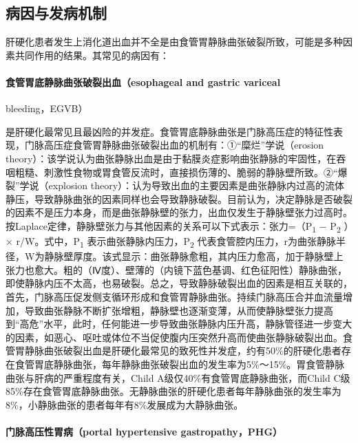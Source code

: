 \subsection{病因与发病机制}

肝硬化患者发生上消化道出血并不全是由食管胃静脉曲张破裂所致，可能是多种因素共同作用的结果。其常见的病因有：

\paragraph{食管胃底静脉曲张破裂出血（esophageal and gastric variceal}
bleeding，EGVB）

是肝硬化最常见且最凶险的并发症。食管胃底静脉曲张是门脉高压症的特征性表现，门脉高压症食管胃静脉曲张破裂出血的机制有：①“糜烂”学说（erosion
theory）：该学说认为曲张静脉出血是由于黏膜炎症影响曲张静脉的牢固性，在吞咽粗糙、刺激性食物或胃食管反流时，直接损伤薄的、脆弱的静脉壁所致。②“爆裂”学说（explosion
theory）：认为导致出血的主要因素是曲张静脉内过高的流体静压，导致静脉曲张的因素同样也会导致静脉破裂。目前认为，决定静脉是否破裂的因素不是压力本身，而是曲张静脉壁的张力，出血仅发生于静脉壁张力过高时。按Laplace定律，静脉壁张力与其他因素的关系可以下式表示：张力=（P\textsubscript{1}
− P\textsubscript{2} ）× r/W。式中，P\textsubscript{1}
表示曲张静脉内压力，P\textsubscript{2}
代表食管腔内压力，r为曲张静脉半径，W为静脉壁厚度。该式显示：曲张静脉愈粗，其内压力愈高，加于静脉壁上张力也愈大。粗的（Ⅳ度）、壁薄的（内镜下蓝色基调、红色征阳性）静脉曲张，即使静脉内压不太高，也易破裂。总之，导致静脉破裂出血的因素是相互关联的，首先，门脉高压促发侧支循环形成和食管胃静脉曲张。持续门脉高压合并血流量增加，导致曲张静脉不断扩张增粗，静脉壁也逐渐变薄，从而使静脉壁张力提高到“高危”水平，此时，任何能进一步导致曲张静脉内压升高，静脉管径进一步变大的因素，如恶心、呕吐或体位不当促使腹内压突然升高而使曲张静脉破裂出血。食管胃静脉曲张破裂出血是肝硬化最常见的致死性并发症，约有50\%的肝硬化患者存在食管胃底静脉曲张，每年静脉曲张破裂出血的发生率为5\%～15\%。胃食管静脉曲张与肝病的严重程度有关，Child
A级仅40\%有食管胃底静脉曲张，而Child
C级85\%存在食管胃底静脉曲张。无静脉曲张的肝硬化患者每年静脉曲张的发生率为8\%，小静脉曲张的患者每年有8\%发展成为大静脉曲张。

\paragraph{门脉高压性胃病（portal hypertensive gastropathy，PHG）}

